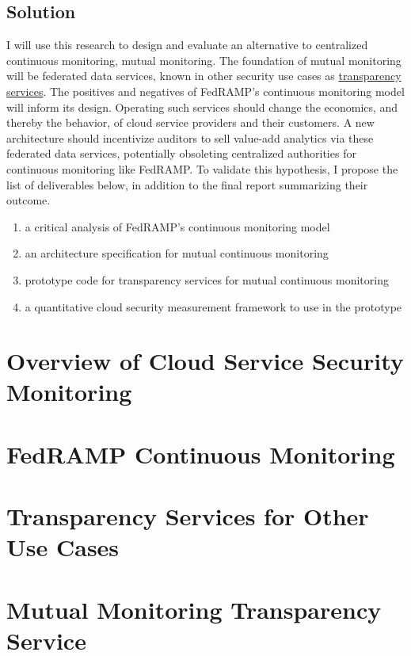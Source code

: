 \documentclass{jdf}
\begin{document}
\subsection{Solution}

I will use this research to design and evaluate an alternative to centralized continuous monitoring, mutual monitoring. The foundation of mutual monitoring will be federated data services, known in other security use cases as \hyperlink{https://transparency.dev}{transparency services}. The positives and negatives of FedRAMP's continuous monitoring model will inform its design. Operating such services should change the economics, and thereby the behavior, of cloud service providers and their customers. A new architecture should incentivize auditors to sell value-add analytics via these federated data services, potentially obsoleting centralized authorities for continuous monitoring like FedRAMP. To validate this hypothesis, I propose the list of deliverables below, in addition to the final report summarizing their outcome. 

\begin{enumerate}
    \item a critical analysis of FedRAMP's continuous monitoring model
    \item an architecture specification for mutual continuous monitoring
    \item prototype code for transparency services for mutual continuous monitoring
    \item a quantitative cloud security measurement framework to use in the prototype
\end{enumerate}

\section{Overview of Cloud Service Security Monitoring}

\section{FedRAMP Continuous Monitoring}

\section{Transparency Services for Other Use Cases}

\section{Mutual Monitoring Transparency Service}
\end{document}
